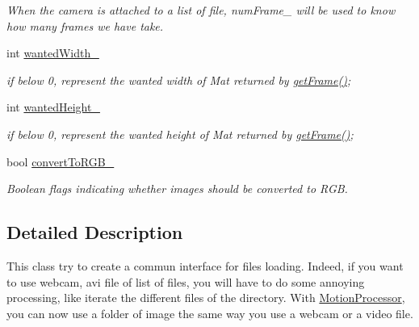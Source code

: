 \begin{DoxyCompactItemize}
\begin{DoxyCompactList}\small\item\em When the camera is attached to a list of file, numFrame\_\- will be used to know how many frames we have take. \end{DoxyCompactList}\item 
\hypertarget{class_opencv_sf_m_1_1_motion_processor_a2bb96b3fcac0b97f4ac1300b45a62338}{
int \hyperlink{class_opencv_sf_m_1_1_motion_processor_a2bb96b3fcac0b97f4ac1300b45a62338}{wantedWidth\_\-}}
\label{class_opencv_sf_m_1_1_motion_processor_a2bb96b3fcac0b97f4ac1300b45a62338}

\begin{DoxyCompactList}\small\item\em if below 0, represent the wanted width of Mat returned by \hyperlink{class_opencv_sf_m_1_1_motion_processor_a2314d6d47c9318b1dc61515ce20cf819}{getFrame()}; \end{DoxyCompactList}\item 
\hypertarget{class_opencv_sf_m_1_1_motion_processor_a830a9edd5325e704b3bce8ed3ecffdba}{
int \hyperlink{class_opencv_sf_m_1_1_motion_processor_a830a9edd5325e704b3bce8ed3ecffdba}{wantedHeight\_\-}}
\label{class_opencv_sf_m_1_1_motion_processor_a830a9edd5325e704b3bce8ed3ecffdba}

\begin{DoxyCompactList}\small\item\em if below 0, represent the wanted height of Mat returned by \hyperlink{class_opencv_sf_m_1_1_motion_processor_a2314d6d47c9318b1dc61515ce20cf819}{getFrame()}; \end{DoxyCompactList}\item 
\hypertarget{class_opencv_sf_m_1_1_motion_processor_a76b155ceb708b8fc1f5ea321e6424155}{
bool \hyperlink{class_opencv_sf_m_1_1_motion_processor_a76b155ceb708b8fc1f5ea321e6424155}{convertToRGB\_\-}}
\label{class_opencv_sf_m_1_1_motion_processor_a76b155ceb708b8fc1f5ea321e6424155}

\begin{DoxyCompactList}\small\item\em Boolean flags indicating whether images should be converted to RGB. \end{DoxyCompactList}\end{DoxyCompactItemize}


\subsection{Detailed Description}
This class try to create a commun interface for files loading. Indeed, if you want to use webcam, avi file of list of files, you will have to do some annoying processing, like iterate the different files of the directory. With \hyperlink{class_opencv_sf_m_1_1_motion_processor}{MotionProcessor}, you can now use a folder of image the same way you use a webcam or a video file. 

